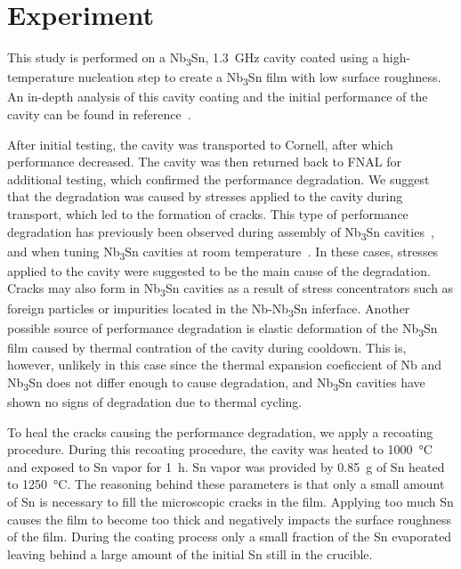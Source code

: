 \section{Experiment}
\label{sec:Experiment}

This study is performed on a Nb\textsubscript{3}Sn, \qty{1.3}{\giga\hertz} cavity coated using a high-temperature nucleation step to create a Nb\textsubscript{3}Sn film with low surface roughness. An in-depth analysis of this cavity coating and the initial performance of the cavity can be found in reference~\cite{posen2021advances}. 

After initial testing, the cavity was transported to Cornell, after which performance decreased. The cavity was then returned back to FNAL for additional testing, which confirmed the performance degradation. We suggest that the degradation was caused by stresses applied to the cavity during transport, which led to the formation of cracks. This type of performance degradation has previously been observed during assembly of Nb\textsubscript{3}Sn cavities~\cite{eremeev2023preservation}, and when tuning Nb\textsubscript{3}Sn cavities at room temperature~\cite{eremeev:srf2019-mop015}. In these cases, stresses applied to the cavity were suggested to be the main cause of the degradation. Cracks may also form in Nb\textsubscript{3}Sn cavities as a result of stress concentrators such as foreign particles or impurities located in the Nb-Nb\textsubscript{3}Sn inferface. Another possible source of performance degradation is elastic deformation of the Nb\textsubscript{3}Sn film caused by thermal contration of the cavity during cooldown. This is, however, unlikely in this case since the thermal expansion coeficcient of Nb and Nb\textsubscript{3}Sn does not differ enough to cause degradation, and Nb\textsubscript{3}Sn cavities have shown no signs of degradation due to thermal cycling.

To heal the cracks causing the performance degradation, we apply a recoating procedure. During this recoating procedure, the cavity was heated to \qty{1000}{\degreeCelsius} and exposed to Sn vapor for \qty{1}{\hour}. Sn vapor was provided by \qty{0.85}{\gram} of Sn heated to \qty{1250}{\degreeCelsius}. The reasoning behind these parameters is that only a small amount of Sn is necessary to fill the microscopic cracks in the film. Applying too much Sn causes the film to become too thick and negatively impacts the surface roughness of the film. During the coating process only a small fraction of the Sn evaporated leaving behind a large amount of the initial Sn still in the crucible. 


